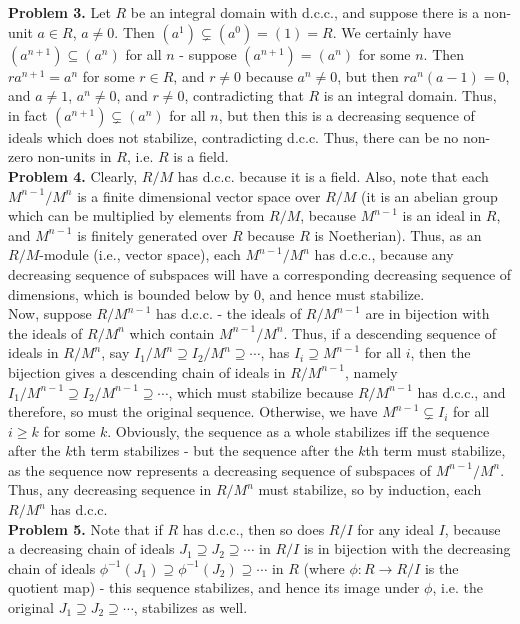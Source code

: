 \documentclass[11pt]{article}
\newcommand{\num}[1]{\noindent \textbf{#1}}
\theoremstyle{definition}
\begin{document}
\num{Problem 3.} Let $R$ be an integral domain with d.c.c., and
suppose there is a non-unit $a\in R$, $a\neq0$. Then $(a^1)\subsetneq
(a^0)=(1)=R$. We certainly have $(a^{n+1})\subseteq(a^n)$ for all $n$ -
suppose $(a^{n+1})=(a^n)$ for some $n$. Then $ra^{n+1}=a^n$ for some $r\in
R$, and $r\neq0$ because $a^n\neq0$, but then $ra^n(a-1)=0$, and $a\neq1$,
$a^n\neq0$, and $r\neq0$, contradicting that $R$ is an integral domain. Thus,
in fact $(a^{n+1})\subsetneq(a^n)$ for all $n$, but then this is a decreasing
sequence of ideals which does not stabilize, contradicting d.c.c. Thus,
there can be no non-zero non-units in $R$, i.e. $R$ is a field.    \\

\num{Problem 4.} Clearly, $R/M$ has d.c.c. because it is a field. Also, note
that each $M^{n-1}/M^n$ is a finite dimensional vector space over $R/M$ (it
is an abelian group which can be multiplied by elements from $R/M$, because
$M^{n-1}$ is an ideal in $R$, and $M^{n-1}$ is finitely generated over $R$
because $R$ is Noetherian). Thus, as an $R/M$-module (i.e., vector space),
each $M^{n-1}/M^n$ has d.c.c., because any decreasing sequence of subspaces
will have a corresponding decreasing sequence of dimensions, which is bounded
below by 0, and hence must stabilize. \\

\noindent Now, suppose $R/M^{n-1}$ has d.c.c. - the ideals of $R/M^{n-1}$ are
in bijection with the ideals of $R/M^n$ which contain $M^{n-1}/M^n$. Thus,
if a descending sequence of ideals in $R/M^n$, say $I_1/M^n\supseteq
I_2/M^n\supseteq \cdots$, has $I_i\supseteq M^{n-1}$ for all $i$, then
the bijection gives a descending chain of ideals in $R/M^{n-1}$, namely
$I_1/M^{n-1}\supseteq I_2/M^{n-1}\supseteq\cdots$, which must stabilize
because $R/M^{n-1}$ has d.c.c., and therefore, so must the original
sequence. Otherwise, we have $M^{n-1}\subsetneq I_i$ for all $i\geq k$ for
some $k$. Obviously, the sequence as a whole stabilizes iff the sequence
after the $k$th term stabilizes - but the sequence after the $k$th term must
stabilize, as the sequence now represents a decreasing sequence of subspaces
of $M^{n-1}/M^n$. Thus, any decreasing sequence in $R/M^n$ must stabilize,
so by induction, each $R/M^n$ has d.c.c.     \\

\num{Problem 5.} Note that if $R$ has d.c.c., then so does $R/I$
for any ideal $I$, because a decreasing chain of ideals $J_1\supseteq
J_2\supseteq\cdots$ in $R/I$ is in bijection with the decreasing chain of
ideals $\phi^{-1}(J_1)\supseteq\phi^{-1}(J_2)\supseteq\cdots$ in $R$ (where
$\phi:R\rightarrow R/I$ is the quotient map) - this sequence stabilizes,
and hence its image under $\phi$, i.e. the original $J_1\supseteq
J_2\supseteq\cdots$, stabilizes as well. \\
\end{document}
